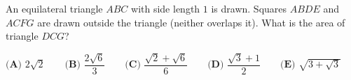 An equilateral triangle $ABC$ with side length $1$ is drawn. Squares $ABDE$ and $ACFG$ are drawn outside the triangle (neither overlaps it). What is the area of triangle $DCG$?

$\textbf{(A) } 2\sqrt{2} \qquad \textbf{(B) } \dfrac{2\sqrt{6}}{3} \qquad \textbf{(C) } \dfrac{\sqrt{2}+\sqrt{6}}{6} \qquad \textbf{(D) } \dfrac{\sqrt{3}+1}{2} \qquad \textbf{(E) } \sqrt{3+\sqrt{3}}$
